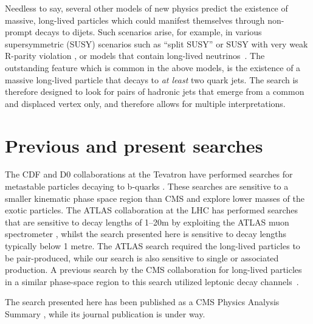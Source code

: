 Needless to say, several other models of new physics predict the existence of massive, 
long-lived particles which could
manifest themselves through non-prompt decays to dijets. Such scenarios arise, for example,
in various supersymmetric (SUSY) scenarios such as ``split SUSY''
\cite{Hewett:2004nw} or SUSY with very weak R-parity violation \cite{Barbier:2004ez}, 
or \Zprime models
that contain long-lived neutrinos~\cite{Basso:2008iv}. 
The outstanding feature which is common in the above models,
is the existence of a massive long-lived particle that decays to {\it at least} two
quark jets. The search is therefore designed to look for pairs of hadronic jets
 that emerge from a common and displaced vertex only, and therefore allows
for multiple interpretations.

\section{Previous and present searches}

The CDF and D0 collaborations at the Tevatron have performed searches for metastable particles decaying to b-quarks
\cite{Aaltonen:2011rja, Abazov:2009ik}.
These searches are sensitive to a smaller kinematic phase space region than CMS and explore
lower masses of the exotic particles. The ATLAS collaboration
at the LHC has performed searches that are sensitive to decay lengths of 1--20\unit{m} by exploiting the ATLAS muon
 spectrometer \cite{ATLAS:2012av}, whilst the search presented here is sensitive to decay lengths 
typically below 1 metre.
 The ATLAS search required the long-lived particles to be pair-produced,
while our search
is also sensitive to single or associated production.
A previous search by the CMS collaboration for long-lived particles in a similar phase-space region
to this search utilized leptonic decay channels~\cite{Chatrchyan:2012jna}.

The search presented here has been published as a CMS Physics Analysis Summary 
\cite{CMS-PAS-EXO-12-038}, while its journal publication is under way.
